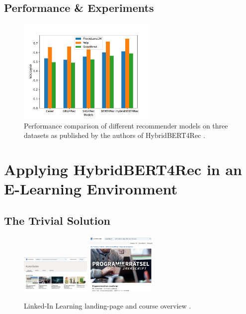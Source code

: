 \documentclass{Academic}
\begin{document}
        \subsection{Performance \& Experiments}
        \begin{figure}[ht!]
            \centering
			\includegraphics[width=0.6\textwidth]{images/results.pdf}
			\caption{Performance comparison of different recommender models on three datasets as published by the authors of HybridBERT4Rec \cite{channarongHybridBERT4RecHybridContentBased2022}.}
            \label{fig:perfExp}
		\end{figure}

    \section{Applying HybridBERT4Rec in an E-Learning Environment}

        \subsection{The Trivial Solution}
        \begin{figure}[ht!]
            \centering
			\includegraphics[width=0.3\textwidth]{images/linked_in_landing.pdf}
            \includegraphics[width=0.3\textwidth]{images/linked_in_course.pdf}
			\caption{Linked-In Learning landing-page and course overview \cite{LinkedInLearningMit}.}
            \label{fig:trivSol}
		\end{figure}
    
\end{document}
